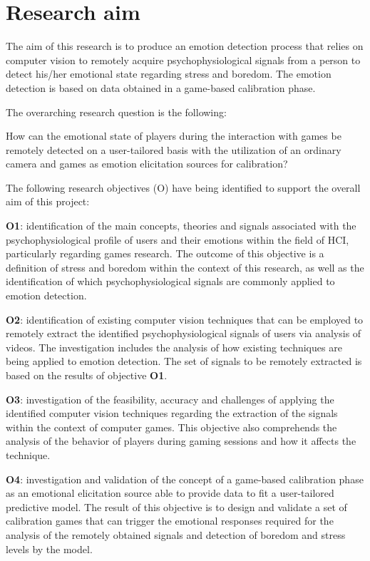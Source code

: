 \section{Research aim}
\label{sec:research-aim}

The aim of this research is to produce an emotion detection process that relies on computer vision to remotely acquire psychophysiological signals from a person to detect his/her emotional state regarding stress and boredom. The emotion detection is based on data obtained in a game-based calibration phase.

The overarching research question is the following:

\begin{fquote}
How can the emotional state of players during the interaction with games be remotely detected on a user-tailored basis with the utilization of an ordinary camera and games as emotion elicitation sources for calibration?
\end{fquote}

The following research objectives (O) have being identified to support the overall aim of this project:

\textbf{O1}: identification of the main concepts, theories and signals associated with the psychophysiological profile of users and their emotions within the field of HCI, particularly regarding games research. The outcome of this objective is a definition of stress and boredom within the context of this research, as well as the identification of which psychophysiological signals are commonly applied to emotion detection.

\textbf{O2}: identification of existing computer vision techniques that can be employed to remotely extract the identified psychophysiological signals of users via analysis of videos. The investigation includes the analysis of how existing techniques are being applied to emotion detection. The set of signals to be remotely extracted is based on the results of objective \textbf{O1}.

\textbf{O3}: investigation of the feasibility, accuracy and challenges of applying the identified computer vision techniques regarding the extraction of the signals within the context of computer games. This objective also comprehends the analysis of the behavior of players during gaming sessions and how it affects the technique.

\textbf{O4}: investigation and validation of the concept of a game-based calibration phase as an emotional elicitation source able to provide data to fit a user-tailored predictive model. The result of this objective is to design and validate a set of calibration games that can trigger the emotional responses required for the analysis of the remotely obtained signals and detection of boredom and stress levels by the model.

